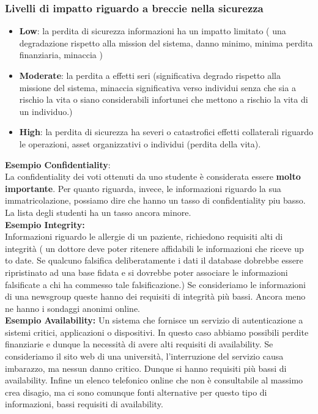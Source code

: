\documentclass[12pt]{article}
\begin{document}
		\subsubsection{Livelli di impatto riguardo a breccie nella sicurezza}
			\begin{itemize}
				\item \textbf{Low}: la perdita di sicurezza informazioni ha un impatto limitato ( una degradazione rispetto alla mission del sistema, danno minimo, minima perdita finanziaria, minaccia  )
				\item \textbf{Moderate}: la perdita a effetti seri (significativa degrado rispetto alla missione del sistema, minaccia significativa verso individui senza che sia a rischio la vita o siano considerabili infortunei che mettono a rischio la vita di un individuo.)
				\item \textbf{High}: la perdita di sicurezza ha severi o catastrofici effetti collaterali riguardo le operazioni, asset organizzativi o individui (perdita della vita).
			\end{itemize}
		\textbf{Esempio Confidentiality}:\\
			La confidentiality dei voti ottenuti da uno studente è considerata essere \textbf{molto importante}. Per quanto riguarda, invece, le informazioni riguardo la sua immatricolazione, possiamo dire che hanno un tasso di confidentiality piu basso. La lista degli studenti ha un tasso ancora minore.		\\
		\textbf{Esempio Integrity:}\\
			Informazioni riguardo le allergie di un paziente, richiedono requisiti alti di integrità ( un dottore deve poter ritenere affidabili le informazioni che riceve up to date. Se qualcuno falsifica deliberatamente i dati il database dobrebbe essere ripristinato ad una base fidata e si dovrebbe poter associare le informazioni falsificate a chi ha commesso tale falsificazione.)
			Se consideriamo le informazioni di una newsgroup queste hanno dei requisiti di integrità più bassi.
			Ancora meno ne hanno i sondaggi anonimi online. \\
		\textbf{Esempio Availability:}
		Un sistema che fornisce un servizio di autenticazione a sistemi critici, applicazioni o dispositivi. In questo caso abbiamo possibili perdite finanziarie e dunque la necessità di avere alti requisiti di availability. Se consideriamo il sito web di una università, l'interruzione del servizio causa imbarazzo, ma nessun danno critico. Dunque si hanno requisiti più bassi di availability. Infine un elenco telefonico online che non è consultabile al massimo crea disagio, ma ci sono comunque fonti alternative per questo tipo di informazioni, bassi requisiti di availability.
		
\end{document}
